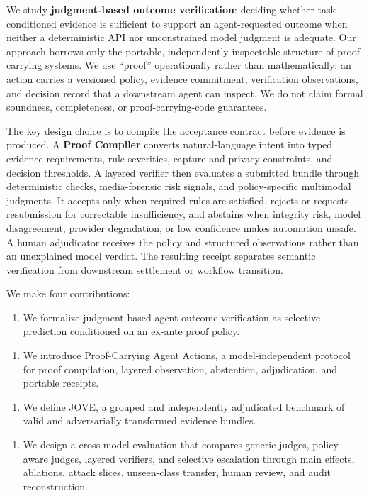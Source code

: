 \documentclass[11pt]{article}
\begin{document}
We study \textbf{judgment-based outcome verification}: deciding whether task-conditioned evidence is sufficient to support an agent-requested outcome when neither a deterministic API nor unconstrained model judgment is adequate. Our approach borrows only the portable, independently inspectable structure of proof-carrying systems. We use ``proof'' operationally rather than mathematically: an action carries a versioned policy, evidence commitment, verification observations, and decision record that a downstream agent can inspect. We do not claim formal soundness, completeness, or proof-carrying-code guarantees.\par

The key design choice is to compile the acceptance contract before evidence is produced. A \textbf{Proof Compiler} converts natural-language intent into typed evidence requirements, rule severities, capture and privacy constraints, and decision thresholds. A layered verifier then evaluates a submitted bundle through deterministic checks, media-forensic risk signals, and policy-specific multimodal judgments. It accepts only when required rules are satisfied, rejects or requests resubmission for correctable insufficiency, and abstains when integrity risk, model disagreement, provider degradation, or low confidence makes automation unsafe. A human adjudicator receives the policy and structured observations rather than an unexplained model verdict. The resulting receipt separates semantic verification from downstream settlement or workflow transition.\par

We make four contributions:\par

\begin{enumerate}\item We formalize judgment-based agent outcome verification as selective prediction conditioned on an ex-ante proof policy.\end{enumerate}
\begin{enumerate}\item We introduce Proof-Carrying Agent Actions, a model-independent protocol for proof compilation, layered observation, abstention, adjudication, and portable receipts.\end{enumerate}
\begin{enumerate}\item We define JOVE, a grouped and independently adjudicated benchmark of valid and adversarially transformed evidence bundles.\end{enumerate}
\begin{enumerate}\item We design a cross-model evaluation that compares generic judges, policy-aware judges, layered verifiers, and selective escalation through main effects, ablations, attack slices, unseen-class transfer, human review, and audit reconstruction.\end{enumerate}
\end{document}
